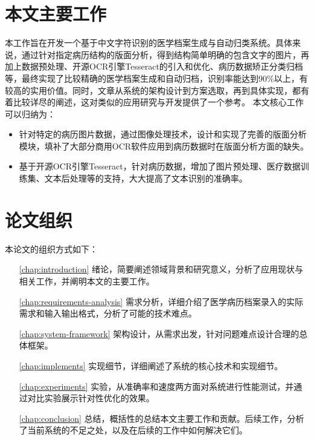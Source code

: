 \section{本文主要工作}
本工作旨在开发一个基于中文字符识别的医学档案生成与自动归类系统。具体来说，通过针对指定病历结构的版面分析，得到结构简单明确的包含文字的图片，再加上数据预处理、开源OCR引擎Tesseract的引入和优化、病历数据矫正分类归档等，最终实现了比较精确的医学档案生成和自动归档，识别率能达到90\%以上，有较高的实用价值。同时，文章从系统的架构设计到方案选取，再到具体实现，都有着比较详尽的阐述，这对类似的应用研究与开发提供了一个参考。
本文核心工作可以归纳为：
\begin{itemize}
  \item 针对特定的病历图片数据，通过图像处理技术，设计和实现了完善的版面分析模块，填补了大部分商用OCR软件应用到病历数据时在版面分析方面的缺失。
  \item 基于开源OCR引擎Tesseract，针对病历数据，增加了图片预处理、医疗数据训练集、文本后处理等的支持，大大提高了文本识别的准确率。
\end{itemize}

\section{论文组织}
本论文的组织方式如下：
\begin{itemize}
	\item[\autoref{chap:introduction}]
	绪论，简要阐述领域背景和研究意义，分析了应用现状与相关工作，并阐明本文的主要工作。
	\item[\autoref{chap:requirements-analysis}] 需求分析，详细介绍了医学病历档案录入的实际需求和输入输出格式，分析了可能的技术难点。
	\item[\autoref{chap:system-framework}]
	架构设计，从需求出发，针对问题难点设计合理的总体框架。
	\item[\autoref{chap:implements}]
	实现细节，详细阐述了系统的核心技术和实现细节。
	\item[\autoref{chap:experiments}]
	实验，从准确率和速度两方面对系统进行性能测试，并通过对比实验展示针对性优化的效果。
	\item[\autoref{chap:conclusion}]
	总结，概括性的总结本文主要工作和贡献。后续工作，分析了当前系统的不足之处，以及在后续的工作中如何解决它们。
\end{itemize}
